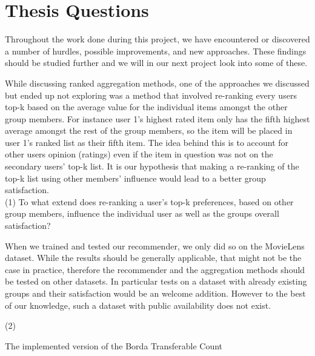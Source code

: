 \section{Thesis Questions}
Throughout the work done during this project, we have encountered or discovered a number of hurdles, possible improvements, and new approaches. These findings should be studied further and we will in our next project look into some of these.

While discussing ranked aggregation methods, one of the approaches we discussed but ended up not exploring was a method that involved re-ranking every users top-k based on the average value for the individual items amongst the other group members. For instance user 1's highest rated item only has the fifth highest average amongst the rest of the group members, so the item will be placed in user 1's ranked list as their fifth item. The idea behind this is to account for other users opinion (ratings) even if the item in question was not on the secondary users' top-k list. It is our hypothesis that making a re-ranking of the top-k list using other members' influence would lead to a better group satisfaction.\\

(1) To what extend does re-ranking a user's top-k preferences, based on other group members, influence the individual user as well as the groups overall satisfaction?

When we trained and tested our recommender, we only did so on the MovieLens dataset. While the results should be generally applicable, that might not be the case in practice, therefore the recommender and the aggregation methods should be tested on other datasets. In particular tests on a dataset with already existing groups and their satisfaction would be an welcome addition. However to the best of our knowledge, such a dataset with public availability does not exist. 

(2) 

The implemented version of the Borda Transferable Count

